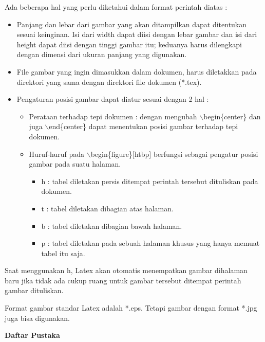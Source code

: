 Ada beberapa hal yang perlu diketahui dalam format perintah diatas :

\begin{itemize}
\item Panjang dan lebar dari gambar yang akan ditampilkan dapat ditentukan sesuai keinginan. Isi dari width dapat diisi dengan lebar gambar dan isi dari height dapat diisi dengan tinggi gambar itu; 
keduanya harus dilengkapi dengan dimensi dari ukuran panjang yang digunakan.
\item File gambar yang ingin dimasukkan dalam dokumen, harus diletakkan pada direktori yang sama dengan direktori file dokumen (*.tex).
\end{itemize}

\begin{itemize}
\item Pengaturan posisi gambar dapat diatur sesuai dengan 2 hal :
\begin{itemize}
\item Perataan terhadap tepi dokumen : dengan mengubah 
$\backslash$begin\{center\} dan juga $\backslash$end\{center\} dapat menentukan posisi gambar terhadap tepi dokumen.
\item Huruf-huruf pada $\backslash$begin\{figure\}$[$htbp$]$ berfungsi sebagai pengatur posisi gambar pada suatu halaman.
\begin{itemize}
\item h : tabel diletakan persis ditempat perintah tersebut dituliskan pada dokumen.
\item t : tabel diletakan dibagian atas halaman.
\item b : tabel diletakan dibagian bawah halaman.
\item p : tabel diletakan pada sebuah halaman khusus yang hanya memuat tabel itu saja.
\end{itemize}
\end{itemize}
\end{itemize}
Saat menggunakan h, Latex akan otomatis menempatkan gambar dihalaman baru jika tidak ada cukup ruang untuk gambar tersebut ditempat perintah gambar dituliskan.\par \vspace{12pt}

Format gambar standar Latex adalah *.eps. Tetapi gambar dengan format *.jpg juga bisa digunakan.\par \vspace{12pt}

\textbf{Daftar Pustaka}\par \vspace{12pt}


